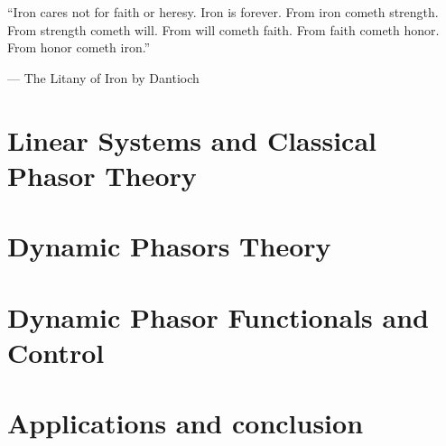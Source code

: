 \documentclass{apaThesis}
\begin{document}
\begin{newepigraph}
``Iron cares not for faith or heresy. Iron is forever. From iron cometh strength. From strength cometh will. From will cometh faith. From faith cometh honor. From honor cometh iron.''

\hfill --- The Litany of Iron by Dantioch
\end{newepigraph}


\begintextbody



\part{Linear Systems and Classical Phasor Theory}\label{part:linearsys_phasor_theory}





\part{Dynamic Phasors Theory}\label{part:dynphasor_theory}





\part{Dynamic Phasor Functionals and Control}\label{part:applications}





\part{Applications and conclusion}\label{part:ending}






\end{document}
